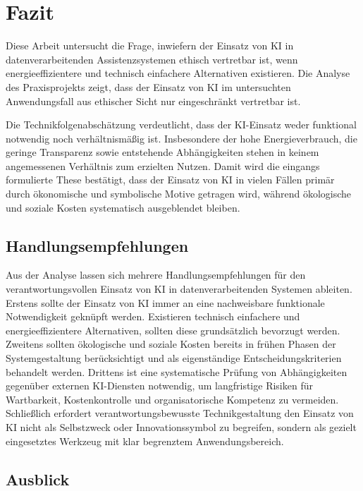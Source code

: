 \chapter{Fazit}
\label{chap:fazit}

Diese Arbeit untersucht die Frage, inwiefern der Einsatz von KI in datenverarbeitenden Assistenzsystemen ethisch vertretbar ist, wenn energieeffizientere und technisch einfachere Alternativen existieren. Die Analyse des Praxisprojekts zeigt, dass der Einsatz von KI im untersuchten Anwendungsfall aus ethischer Sicht nur eingeschränkt vertretbar ist.

Die Technikfolgenabschätzung verdeutlicht, dass der KI-Einsatz weder funktional notwendig noch verhältnismäßig ist. Insbesondere der hohe Energieverbrauch, die geringe Transparenz sowie entstehende Abhängigkeiten stehen in keinem angemessenen Verhältnis zum erzielten Nutzen. Damit wird die eingangs formulierte These bestätigt, dass der Einsatz von KI in vielen Fällen primär durch ökonomische und symbolische Motive getragen wird, während ökologische und soziale Kosten systematisch ausgeblendet bleiben.

\section{Handlungsempfehlungen}

Aus der Analyse lassen sich mehrere Handlungsempfehlungen für den verantwortungsvollen Einsatz von KI in datenverarbeitenden Systemen ableiten. Erstens sollte der Einsatz von KI immer an eine nachweisbare funktionale
Notwendigkeit geknüpft werden. Existieren technisch einfachere und energieeffizientere Alternativen, sollten diese grundsätzlich bevorzugt werden. Zweitens sollten ökologische und soziale Kosten bereits in frühen Phasen der Systemgestaltung berücksichtigt und als eigenständige Entscheidungskriterien behandelt werden. Drittens ist eine systematische Prüfung von Abhängigkeiten gegenüber externen KI-Diensten notwendig, um langfristige Risiken für Wartbarkeit, Kostenkontrolle und organisatorische Kompetenz zu vermeiden. Schließlich erfordert verantwortungsbewusste Technikgestaltung den Einsatz von KI nicht als Selbstzweck oder Innovationssymbol zu begreifen, sondern als gezielt eingesetztes Werkzeug mit klar begrenztem Anwendungsbereich.

\section{Ausblick}

